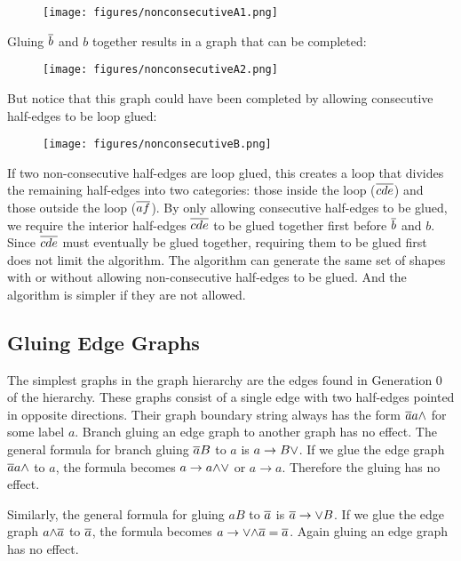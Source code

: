 \documentclass[acmtog]{acmart}
\begin{document}
\begin{figure}[H]
\centering
\texttt{[image: figures/nonconsecutiveA1.png]}
\end{figure}

Gluing $\overline{b}$ and $b$ together results in a graph that can be completed:

\begin{figure}[H]
\centering
\texttt{[image: figures/nonconsecutiveA2.png]}
\end{figure}

But notice that this graph could have been completed by allowing consecutive
half-edges to be loop glued:

\begin{figure}[H]
\centering
\texttt{[image: figures/nonconsecutiveB.png]}
\end{figure}

If two non-consecutive half-edges are loop glued, this creates a loop that 
divides the remaining half-edges into two categories: those inside the loop
($\overline{cde}$) and those outside the loop ($\overline{af}$). By only allowing
consecutive half-edges to be glued, we require the interior half-edges
$\overline{cde}$ to be glued together first before $\overline{b}$ and $b$. Since $\overline{cde}$
must eventually be glued together, requiring them to be glued first does not
limit the algorithm. The algorithm can generate the same set of shapes with or
without allowing non-consecutive half-edges to be glued. And the algorithm is
simpler if they are not allowed.

\subsection{Gluing Edge Graphs}
\label{edge gluing}

The simplest graphs in the graph hierarchy are the edges found in Generation 0
of the hierarchy. These graphs consist of a single edge with two half-edges 
pointed in opposite directions. Their graph boundary string always has the 
form $\overline{a}a {\wedge}$ for some label $a$. Branch gluing an edge graph to 
another graph has no effect. The general formula for branch gluing $\overline{a}B$ 
to $a$ is $a \rightarrow B {\vee}$. If we glue the edge graph $\overline{a}a {\wedge}$ to $ 
a$, the formula becomes $a \rightarrow a {\wedge} {\vee}$ or $a \rightarrow a$. 
Therefore the gluing has no effect.

Similarly, the general formula for gluing $aB$ to $\overline{a}$ is $\overline{a} 
\rightarrow {\vee} B$. If we glue the edge graph $a {\wedge} \overline{a}$ to $\overline{a}$, the formula becomes $a \rightarrow {\vee} {\wedge}  \overline{a} = \overline{a}$. 
Again gluing an edge graph has no effect.
\end{document}
